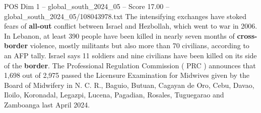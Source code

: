 \begin{textsample}{POS Dim 1 – global\_south\_2024\_05 – Score 17.00 – global\_south\_2024\_05/108043978.txt}
The intensifying exchanges have stoked fears of \textbf{all-out} conflict between Israel and Hezbollah, which went to war in 2006.
In Lebanon, at least 390 people have been killed in nearly seven months of \textbf{cross-border} violence, mostly militants but also more than 70 civilians, according to an AFP tally.
Israel says 11 soldiers and nine civilians have been killed on its side of the \textbf{border}.
The Professional Regulation Commission ( PRC ) announces that 1,698 out of 2,975 passed the Licensure Examination for Midwives given by the Board of Midwifery in N.
C.
R., Baguio, Butuan, Cagayan de Oro, Cebu, Davao, Iloilo, Koronadal, Legazpi, Lucena, Pagadian, Rosales, Tuguegarao and Zamboanga last April 2024.

\end{textsample}
